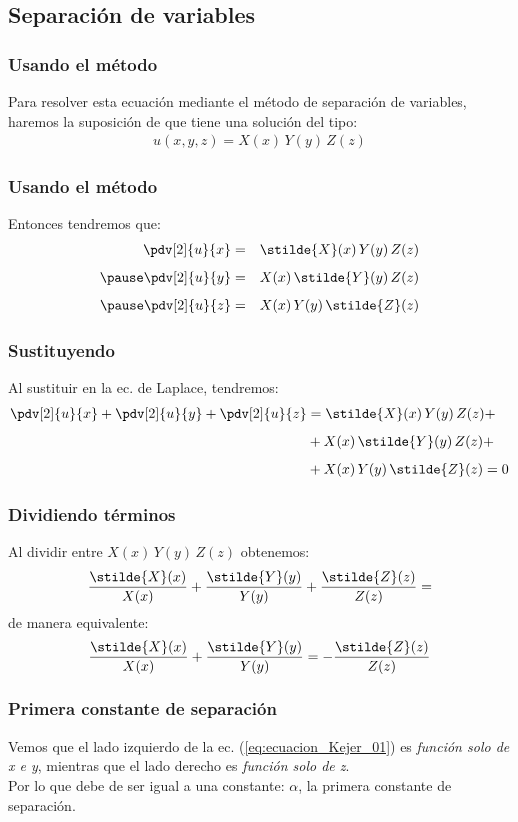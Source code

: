 \subsection{Separación de variables}
\begin{frame}
\frametitle{Usando el método}
Para resolver esta ecuación mediante el método de separación de variables, haremos la suposición de que tiene una solución del tipo:
\begin{align*}
u(x, y, z) = X(x) \, Y(y) \, Z(z)
\end{align*}
\end{frame}
\begin{frame}
\frametitle{Usando el método}
Entonces tendremos que:
\begin{eqnarray*}
\pdv[2]{u}{x} &=& \stilde{X} (x) \, Y(y) \, Z (z) \\[0.5em] \pause
\pdv[2]{u}{y} &=& X (x) \, \stilde{Y} (y) \, Z (z) \\[0.5em] \pause
\pdv[2]{u}{z} &=& X (x) \, Y(y) \, \stilde{Z} (z)
\end{eqnarray*}
\end{frame}
\begin{frame}
\frametitle{Sustituyendo}
Al sustituir en la ec. de Laplace, tendremos:
\begin{align*}
\pdv[2]{u}{x} + \pdv[2]{u}{y} + \pdv[2]{u}{z} &= \stilde{X} (x) \, Y(y) \, Z (z) + \\[0.5em]
&+ X (x) \, \stilde{Y} (y) \, Z (z) + \\[0.5em]
&+ X (x) \, Y(y) \, \stilde{Z} (z) = 0
\end{align*}
\end{frame}
\begin{frame}
\frametitle{Dividiendo términos}
Al dividir entre $X(x) \, Y(y) \, Z(z)$ obtenemos:
\begin{align*}
\dfrac{\stilde{X} (x)}{X(x)} + \dfrac{\stilde{Y} (y)}{Y(y)} + \dfrac{\stilde{Z} (z)}{Z(z)} =
\end{align*}
\pause
de manera equivalente:
\begin{align}
\dfrac{\stilde{X} (x)}{X(x)} + \dfrac{\stilde{Y} (y)}{Y(y)} = -  \dfrac{\stilde{Z} (z)}{Z(z)}
\label{eq:ecuacion_Kejer_01}
\end{align}
\end{frame}
\begin{frame}
\frametitle{Primera constante de separación}
Vemos que el lado izquierdo de la ec. (\ref{eq:ecuacion_Kejer_01}) es \emph{función solo de x e y}, mientras que el lado derecho es \emph{función solo de z}.
\\
\bigskip
\pause
Por lo que debe de ser igual a una constante: $\alpha$, la primera constante de separación.
\end{frame}
